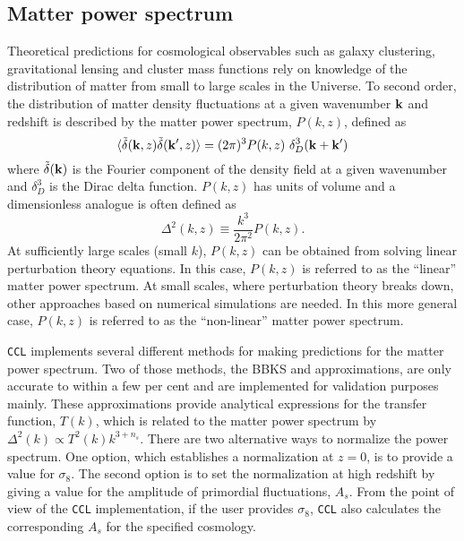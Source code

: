 \documentclass[\docopts]{\docclass}
\newcommand{\ccl}{{\tt CCL}\xspace}
\begin{document}
\subsection{Matter power spectrum}
\label{sec:matterps}

Theoretical predictions for cosmological observables such as galaxy clustering, gravitational lensing and cluster mass functions rely on knowledge of the distribution of matter from small to large scales in the Universe. To second order, the distribution of matter density fluctuations at a given wavenumber ${\bf k}$ and redshift is described by the matter power spectrum, $P(k,z)$, defined as
\begin{equation}
  \langle \tilde\delta({\bf k},z)\tilde\delta({\bf k}^\prime,z)\rangle = (2\pi)^3P(k,z)\
\delta_D^3({\bf k}+{\bf k}')
\end{equation}
where $\tilde\delta({\bf k})$ is the Fourier component of the density field at a given wavenumber and $\delta_D^3$ is the Dirac delta function. $P(k,z)$ has units of volume and a dimensionless analogue is often defined as
\begin{equation}
  \Delta^2(k,z) \equiv \frac{k^3}{2\pi^2}P(k,z).
\end{equation}
At sufficiently large scales (small $k$), $P(k,z)$ can be obtained from solving linear perturbation theory equations. In this case, $P(k,z)$ is referred to as the ``linear'' matter power spectrum. At small scales, where perturbation theory breaks down, other approaches based on numerical simulations are needed. In this more general case, $P(k,z)$ is referred to as the ``non-linear'' matter power spectrum.

\ccl implements several different methods for making predictions for the matter power spectrum. Two of those methods, the BBKS \citep{BBKS} and \citet{1998ApJ...496..605E} approximations, are only accurate to within a few per cent and are implemented for validation purposes mainly. These approximations provide analytical expressions for the transfer function, $T(k)$, which is related to the matter power spectrum by $\Delta^2(k) \propto T^2(k) k^{3+n_s}$. There are two alternative ways to normalize the power spectrum. One option, which establishes a normalization at $z=0$, is to provide a value for $\sigma_8$. The second option is to set the normalization at high redshift by giving a value for the amplitude of primordial fluctuations, $A_s$. From the point of view of the \ccl implementation, if the user provides $\sigma_8$, \ccl also calculates the corresponding $A_s$ for the specified cosmology.
\end{document}

